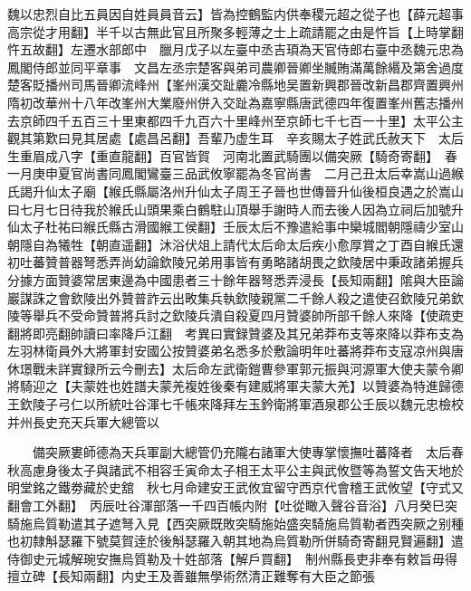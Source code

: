 魏以忠烈自比五員因自姓員員音云】皆為控鶴監内供奉稷元超之從子也【薛元超事高宗從才用翻】半千以古無此官且所聚多輕薄之士上疏請罷之由是忤旨【上時掌翻忤五故翻】左遷水部郎中　臘月戊子以左臺中丞吉頊為天官侍郎右臺中丞魏元忠為鳳閣侍郎並同平章事　文昌左丞宗楚客與弟司農卿晉卿坐贓賄滿萬餘緡及第舍過度楚客貶播州司馬晉卿流峰州【峯州漢交趾麊冷縣地吴置新興郡晉改新昌郡齊置興州隋初改華州十八年改峯州大業廢州併入交趾為嘉寧縣唐武德四年復置峯州舊志播州去京師四千五百三十里東都四千九百六十里峰州至京師七千七百一十里】太平公主觀其第歎曰見其居處【處昌呂翻】吾輩乃虚生耳　辛亥賜太子姓武氏赦天下　太后生重眉成八字【重直龍翻】百官皆賀　河南北置武騎團以備突厥【騎奇寄翻】　春一月庚申夏官尚書同鳳閣鸞臺三品武攸寧罷為冬官尚書　二月己丑太后幸嵩山過緱氏謁升仙太子廟【緱氏縣屬洛州升仙太子周王子晉也世傳晉升仙後桓良遇之於嵩山曰七月七日待我於緱氏山頭果乘白鶴駐山頂舉手謝時人而去後人因為立祠后加號升仙太子杜祐曰緱氏縣古滑國緱工侯翻】壬辰太后不豫遣給事中欒城閻朝隱禱少室山朝隱自為犧牲【朝直遥翻】沐浴伏俎上請代太后命太后疾小愈厚賞之丁酉自緱氏還　初吐蕃贊普器弩悉弄尚幼論欽陵兄弟用事皆有勇略諸胡畏之欽陵居中秉政諸弟握兵分據方面贊婆常居東邊為中國患者三十餘年器弩悉弄浸長【長知兩翻】隂與大臣論巖謀誅之會欽陵出外贊普詐云出畋集兵執欽陵親黨二千餘人殺之遣使召欽陵兄弟欽陵等舉兵不受命贊普將兵討之欽陵兵潰自殺夏四月贊婆帥所部千餘人來降【使疏吏翻將即亮翻帥讀曰率降戶江翻　考異曰實録贊婆及其兄弟莽布支等來降以莽布支為左羽林衛員外大將軍封安國公按贊婆弟名悉多於敷論明年吐蕃將莽布支寇凉州與唐休璟戰未詳實録所云今刪去】太后命左武衛鎧曹參軍郭元振與河源軍大使夫蒙令卿將騎迎之【夫蒙姓也姓譜夫蒙羌複姓後秦有建威將軍夫蒙大羌】以贊婆為特進歸德王欽陵子弓仁以所統吐谷渾七千帳來降拜左玉鈐衛將軍酒泉郡公壬辰以魏元忠檢校并州長史充天兵軍大總管以

　　備突厥婁師德為天兵軍副大總管仍充隴右諸軍大使專掌懷撫吐蕃降者　太后春秋高慮身後太子與諸武不相容壬寅命太子相王太平公主與武攸暨等為誓文告天地於明堂銘之鐵劵藏於史舘　秋七月命建安王武攸宜留守西京代會稽王武攸望【守式又翻會工外翻】　丙辰吐谷渾部落一千四百帳内附【吐從瞰入聲谷音浴】八月癸巳突騎施烏質勒遣其子遮弩入見【西突厥既敗突騎施始盛突騎施烏質勒者西突厥之别種也初隸斛瑟羅下號莫賀逹於後斛瑟羅入朝其地為烏質勒所併騎奇寄翻見賢遍翻】遣侍御史元城解琬安撫烏質勒及十姓部落【解戶買翻】　制州縣長吏非奉有敕旨毋得擅立碑【長知兩翻】内史王及善雖無學術然清正難奪有大臣之節張

